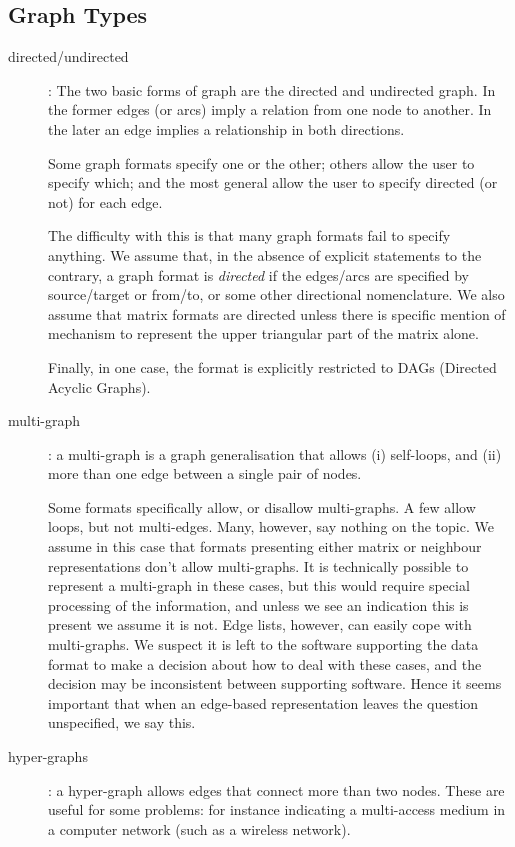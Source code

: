 \documentclass{sig-alternate}
\begin{document}
\subsection{Graph Types}

\begin{description}
\item[directed/undirected]: The two basic forms of graph are the
  directed and undirected graph. In the former edges (or arcs) imply a
  relation from one node to another. In the later an edge implies a
  relationship in both directions.

  Some graph formats specify one or the other; others allow the user
  to specify which; and the most general allow the user to specify
  directed (or not) for each edge. 

  The difficulty with this is that many graph formats fail to specify
  anything. We assume that, in the absence of explicit statements to
  the contrary, a graph format is {\em directed} if the edges/arcs are
  specified by source/target or from/to, or some other directional
  nomenclature. We also assume that matrix formats are directed unless
  there is specific mention of mechanism to represent the upper
  triangular part of the matrix alone.

  Finally, in one case, the format is explicitly restricted to DAGs
  (Directed Acyclic Graphs). 

\item[multi-graph]: a multi-graph is a graph generalisation that
  allows (i) self-loops, and (ii) more than one edge between a single
  pair of nodes.

  Some formats specifically allow, or disallow multi-graphs. A few
  allow loops, but not multi-edges. Many, however, say nothing on the
  topic. We assume in this case that formats presenting either matrix
  or neighbour representations don't allow multi-graphs. It is
  technically possible to represent a multi-graph in these cases, but
  this would require special processing of the information, and unless
  we see an indication this is present we assume it is not. Edge
  lists, however, can easily cope with multi-graphs. We suspect it is
  left to the software supporting the data format to make a decision
  about how to deal with these cases, and the decision may be
  inconsistent between supporting software. Hence it seems important
  that when an edge-based representation leaves the question
  unspecified, we say this.

\item[hyper-graphs]: a hyper-graph allows edges that connect more than
  two nodes. These are useful for some problems: for instance
  indicating a multi-access medium in a computer network (such as a
  wireless network).


\end{description}
\end{document}
